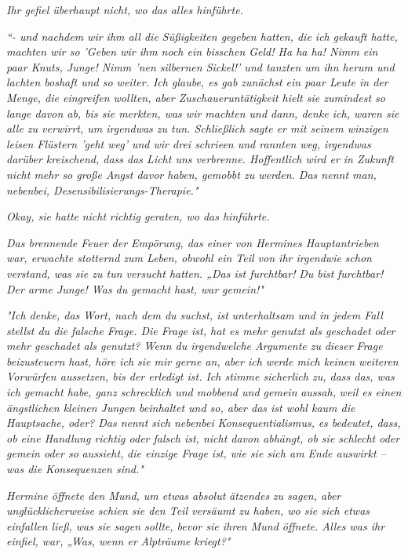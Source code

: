 {\emph{Ihr gefiel überhaupt nicht, wo das alles hinführte.}

\emph{“- und nachdem wir ihm all die Süßigkeiten gegeben hatten, die ich} \emph{gekauft hatte, machten wir so 'Geben wir ihm noch ein bisschen Geld! Ha ha ha! Nimm ein paar Knuts, Junge! Nimm 'nen silbernen Sickel!' und tanzten um ihn herum und lachten boshaft und so weiter. Ich glaube, es gab zunächst ein paar Leute in der Menge, die eingreifen wollten, aber Zuschaueruntätigkeit hielt sie zumindest so lange davon ab, bis sie merkten, was wir machten und dann, denke ich, waren sie alle zu verwirrt, um irgendwas zu tun. Schließlich sagte er mit seinem winzigen leisen Flüstern 'geht weg' und wir drei schrieen und rannten weg, irgendwas darüber kreischend, dass das Licht uns verbrenne. Hoffentlich wird er in Zukunft nicht mehr so große Angst davor haben, gemobbt zu werden. Das nennt man, nebenbei, Desensibilisierungs-Therapie."}

\emph{Okay, sie hatte} \emph{\emph{nicht}} \emph{richtig geraten, wo das hinführte.}

\emph{Das brennende Feuer der Empörung, das einer von Hermines Hauptantrieben war, erwachte stotternd zum Leben, obwohl ein Teil von ihr irgendwie} \emph{\emph{schon}} \emph{verstand, was sie zu tun versucht hatten. „Das ist furchtbar!} \emph{\emph{Du bist}} \emph{furchtbar! Der arme Junge! Was du gemacht hast, war} \emph{\emph{gemein!}"}

\emph{"Ich denke, das Wort, nach dem du suchst, ist} \emph{\emph{unterhaltsam}} \emph{und in jedem Fall stellst du die falsche Frage. Die Frage ist, hat es mehr genutzt als geschadet oder mehr geschadet als genutzt? Wenn du irgendwelche Argumente zu} \emph{\emph{dieser}} \emph{Frage beizusteuern hast, höre ich sie mir gerne an, aber ich werde mich keinen weiteren Vorwürfen aussetzen, bis der erledigt ist. Ich stimme sicherlich zu, dass das, was ich gemacht habe, ganz schrecklich und mobbend und gemein} \emph{\emph{aussah,}} \emph{weil es einen ängstlichen kleinen Jungen beinhaltet und so, aber das ist wohl kaum die Hauptsache, oder? Das nennt sich nebenbei} \emph{\emph{Konsequentialismus,}} \emph{es bedeutet, dass, ob eine Handlung richtig oder falsch ist, nicht davon abhängt, ob sie schlecht oder gemein oder so} \emph{\emph{aussieht,}} \emph{die einzige Frage ist, wie sie sich am Ende auswirkt -- was die Konsequenzen sind."}

\emph{Hermine öffnete den Mund, um etwas absolut} \emph{\emph{ätzendes}} \emph{zu sagen, aber unglücklicherweise schien sie den Teil versäumt zu haben, wo sie sich etwas einfallen ließ, was sie sagen sollte, bevor sie ihren Mund öffnete. Alles was ihr einfiel, war, „Was, wenn er} \emph{\emph{Alpträume}} \emph{kriegt?"}

}
